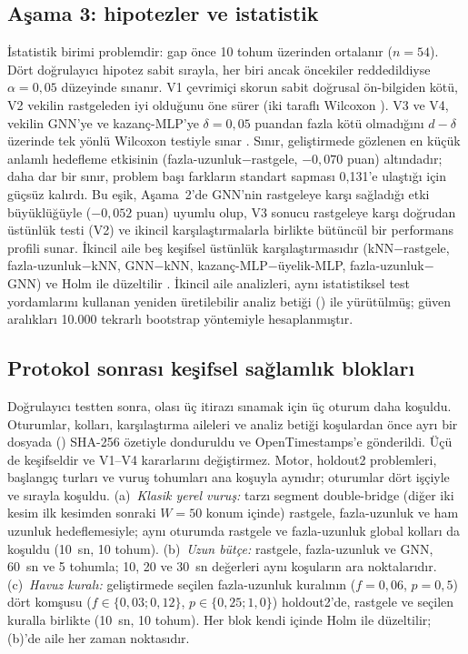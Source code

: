 \documentclass[pdflatex,sn-basic]{sn-jnl}
\begin{document}
\subsection{Aşama 3: hipotezler ve istatistik}\label{sec:deney-istatistik}

İstatistik birimi problemdir: gap önce 10 tohum üzerinden ortalanır ($n=54$). Dört doğrulayıcı
hipotez sabit sırayla, her biri ancak öncekiler reddedildiyse $\alpha=0{,}05$ düzeyinde sınanır.
V1 çevrimiçi skorun sabit doğrusal ön-bilgiden kötü, V2 vekilin rastgeleden iyi olduğunu öne sürer
(iki taraflı Wilcoxon \citep{wilcoxon_1945}). V3 ve V4, vekilin GNN'ye ve kazanç-MLP'ye
$\delta=0{,}05$ puandan fazla kötü olmadığını $d-\delta$ üzerinde tek yönlü Wilcoxon testiyle sınar
\citep{schuirmann_1987_tost, lakens_2017_equivalence}.
Sınır, geliştirmede gözlenen en küçük anlamlı hedefleme etkisinin (fazla-uzunluk$-$rastgele,
$-0{,}070$ puan) altındadır; daha dar bir sınır, problem başı farkların standart sapması 0,131'e
ulaştığı için güçsüz kalırdı.
Bu eşik, Aşama~2'de GNN'nin rastgeleye karşı sağladığı etki büyüklüğüyle ($-0{,}052$ puan)
uyumlu olup, V3 sonucu rastgeleye karşı doğrudan üstünlük testi (V2) ve ikincil karşılaştırmalarla
birlikte bütüncül bir performans profili sunar.
İkincil aile beş keşifsel üstünlük karşılaştırmasıdır (kNN$-$rastgele, fazla-uzunluk$-$kNN,
GNN$-$kNN, kazanç-MLP$-$üyelik-MLP, fazla-uzunluk$-$GNN) ve Holm ile düzeltilir \citep{holm_1979}.
İkincil aile analizleri, aynı istatistiksel test yordamlarını kullanan yeniden üretilebilir analiz
betiği () ile yürütülmüş; güven aralıkları 10.000 tekrarlı bootstrap yöntemiyle
hesaplanmıştır.

\subsection{Protokol sonrası keşifsel sağlamlık blokları}\label{sec:deney-saglamlik}

Doğrulayıcı testten sonra, olası üç itirazı sınamak için üç oturum daha koşuldu. Oturumlar, kolları,
karşılaştırma aileleri ve analiz betiği koşulardan önce ayrı bir dosyada
() SHA-256 özetiyle donduruldu ve OpenTimestamps'e gönderildi.
Üçü de keşifseldir ve V1--V4 kararlarını değiştirmez. Motor, holdout2 problemleri, başlangıç turları
ve vuruş tohumları ana koşuyla aynıdır; oturumlar dört işçiyle ve sırayla koşuldu.
(a)~\emph{Klasik yerel vuruş:} \citet{applegate_2003_clk} tarzı segment double-bridge (diğer iki
kesim ilk kesimden sonraki $W=50$ konum içinde) rastgele, fazla-uzunluk ve ham uzunluk hedeflemesiyle;
aynı oturumda rastgele ve fazla-uzunluk global kolları da koşuldu (10~sn, 10 tohum).
(b)~\emph{Uzun bütçe:} rastgele, fazla-uzunluk ve GNN, 60~sn ve 5 tohumla; 10, 20 ve 30~sn
değerleri aynı koşuların ara noktalarıdır.
(c)~\emph{Havuz kuralı:} geliştirmede seçilen fazla-uzunluk kuralının ($f=0{,}06$, $p=0{,}5$) dört
komşusu ($f\in\{0{,}03;0{,}12\}$, $p\in\{0{,}25;1{,}0\}$) holdout2'de, rastgele ve seçilen kuralla
birlikte (10~sn, 10 tohum).
Her blok kendi içinde Holm ile düzeltilir; (b)'de aile her zaman noktasıdır.
\end{document}
